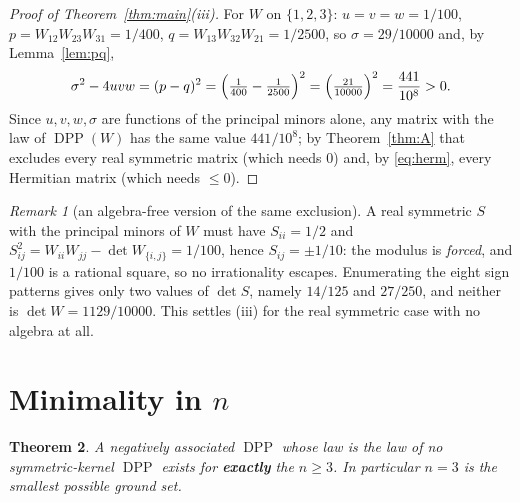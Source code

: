 \documentclass[11pt]{amsart}
\newtheorem{theorem}{Theorem}
\theoremstyle{remark}
\newtheorem{remark}[theorem]{Remark}
\DeclareMathOperator{\DPP}{DPP}
\begin{document}
\begin{proof}[Proof of Theorem~\ref{thm:main}(iii)]
For $W$ on $\{1,2,3\}$: $u=v=w=1/100$, $p=W_{12}W_{23}W_{31}=1/400$,
$q=W_{13}W_{32}W_{21}=1/2500$, so $\sigma=29/10000$ and, by Lemma~\ref{lem:pq},
\[
 \sigma^{2}-4uvw=(p-q)^{2}=\Bigl(\tfrac1{400}-\tfrac1{2500}\Bigr)^{2}
 =\Bigl(\tfrac{21}{10000}\Bigr)^{2}=\frac{441}{10^{8}}>0 .
\]
Since $u,v,w,\sigma$ are functions of the principal minors alone, any matrix with the law of
$\DPP(W)$ has the same value $441/10^{8}$; by Theorem~\ref{thm:A} that excludes every real
symmetric matrix (which needs $0$) and, by \eqref{eq:herm}, every Hermitian matrix (which
needs $\le0$).
\end{proof}

\begin{remark}[an algebra-free version of the same exclusion]\label{rem:signs}
A real symmetric $S$ with the principal minors of $W$ must have $S_{ii}=1/2$ and
$S_{ij}^{2}=W_{ii}W_{jj}-\det W_{\{i,j\}}=1/100$, hence $S_{ij}=\pm1/10$: the modulus is
\emph{forced}, and $1/100$ is a rational square, so no irrationality escapes. Enumerating the
eight sign patterns gives only two values of $\det S$, namely $14/125$ and $27/250$, and
neither is $\det W=1129/10000$. This settles (iii) for the real symmetric case with no
algebra at all.
\end{remark}

\section{Minimality in $n$}\label{sec:sharp}

\begin{theorem}\label{thm:D}
A negatively associated $\DPP$ whose law is the law of no symmetric-kernel $\DPP$ exists for
\textbf{exactly} the $n\ge3$. In particular $n=3$ is the smallest possible ground set.
\end{theorem}
\end{document}

